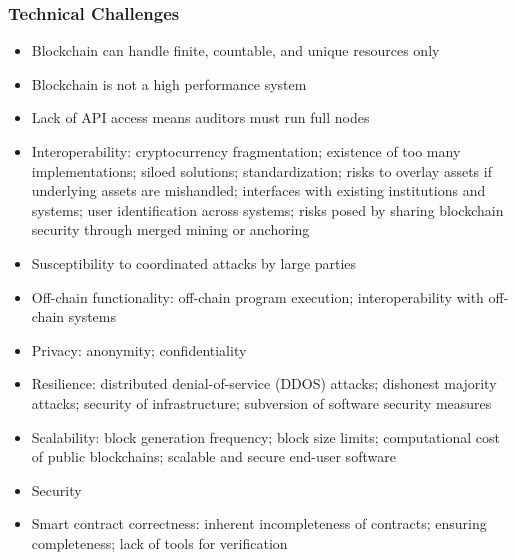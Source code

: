 {\subsubsection{Technical Challenges}
\begin{itemize}
	\item{Blockchain can handle finite, countable, and unique resources only}
	\item{Blockchain is not a high performance system}
	\item{Lack of API access means auditors must run full nodes}
	\item{Interoperability: cryptocurrency fragmentation; existence of too many implementations; siloed solutions; standardization; risks to overlay assets if underlying assets are mishandled; interfaces with existing institutions and systems; user identification across systems; risks posed by sharing blockchain security through merged mining or anchoring}	
        \item{Susceptibility to coordinated attacks by large parties}
	\item{Off-chain functionality: off-chain program execution; interoperability with off-chain systems}
	\item{Privacy: anonymity; confidentiality}
	\item{Resilience: distributed denial-of-service (DDOS) attacks; dishonest majority attacks; security of infrastructure; subversion of software security measures}		
	\item{Scalability: block generation frequency; block size limits; computational cost of public blockchains; scalable and secure end-user software}
	\item{Security}
	\item{Smart contract correctness: inherent incompleteness of contracts; ensuring completeness; lack of tools for verification}
\end{itemize}

}
